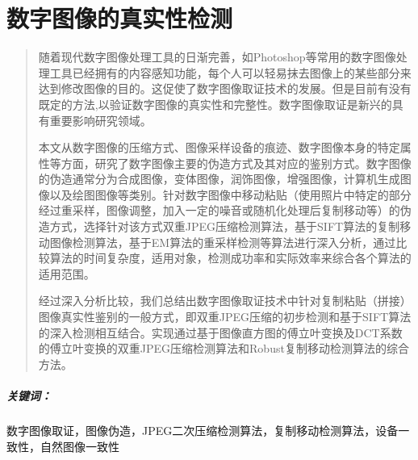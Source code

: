 \documentclass[a4paper, 10pt, notitlepage]{report}
\newcommand{\sihao}{\fontsize{14pt}{\baselineskip}\selectfont}
\newcommand{\wuhao}{\fontsize{10.5pt}{\baselineskip}\selectfont}
\begin{document}
\fontsize{10.5pt}{13pt}\selectfont%

\chapter*{数字图像的真实性检测}
	\thispagestyle{myheadings}
	\renewcommand{\abstractname}{\sihao\sffamily\mdseries 摘要}
	\begin{abstract}
	\wuhao
	\vspace{25pt}
	随着现代数字图像处理工具的日渐完善，如Photoshop等常用的数字图像处理工具已经拥有的内容感知功能，每个人可以轻易抹去图像上的某些部分来达到修改图像的目的。这促使了数字图像取证技术的发展。但是目前有没有既定的方法,以验证数字图像的真实性和完整性。数字图像取证是新兴的具有重要影响研究领域。

	本文从数字图像的压缩方式、图像采样设备的痕迹、数字图像本身的特定属性等方面，研究了数字图像主要的伪造方式及其对应的鉴别方式。数字图像的伪造通常分为合成图像，变体图像，润饰图像，增强图像，计算机生成图像以及绘图图像等类别。针对数字图像中移动粘贴（使用照片中特定的部分经过重采样，图像调整，加入一定的噪音或随机化处理后复制移动等）的伪造方式，选择针对该方式双重JPEG压缩检测算法，基于SIFT算法的复制移动图像检测算法，基于EM算法的重采样检测等算法进行深入分析，通过比较算法的时间复杂度，适用对象，检测成功率和实际效率来综合各个算法的适用范围。

	经过深入分析比较，我们总结出数字图像取证技术中针对复制粘贴（拼接）图像真实性鉴别的一般方式，即双重JPEG压缩的初步检测和基于SIFT算法的深入检测相互结合。实现通过基于图像直方图的傅立叶变换及DCT系数的傅立叶变换的双重JPEG压缩检测算法和Robust复制移动检测算法的综合方法。

	\end{abstract}

	\vspace{16pt}
	\paragraph{关键词：}
	数字图像取证，图像伪造，JPEG二次压缩检测算法，复制移动检测算法，设备一致性，自然图像一致性
\end{document}
